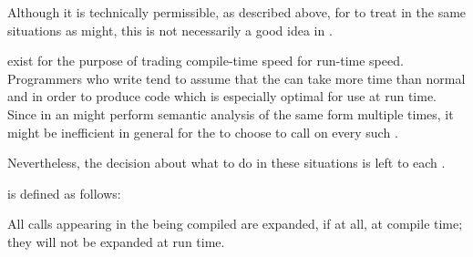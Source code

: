 
Although it is technically permissible, as described above,
for  to treat  in the same situations
as  might, this is not necessarily a good idea in
.

 exist for the purpose of trading compile-time speed
for run-time speed.  Programmers who write  tend to
assume that the  can take more time than normal 
and  in order to produce code which is especially optimal for use
at run time.  Since  in an 
might perform semantic analysis of the same form multiple times, it might be 
inefficient in general for the  to choose to call
 on every such .

Nevertheless, the decision about what to do in these situations is left to
each .

\endsubsubsubsubsection%

\endsubsubsubsection%

\endsubsubsection%




 is defined as follows:

\beginlist 
{}
\itemitem{\bull} All  calls appearing in the
 being compiled are expanded, if at all, at compile time;
they will not be expanded at run time.


